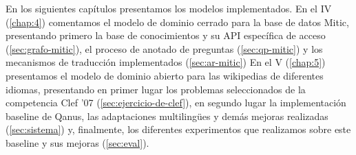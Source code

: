 En los siguientes capítulos presentamos los modelos implementados. En el IV (\ref{chap:4}) comentamos el modelo de dominio cerrado para la base de datos  Mitic, presentando primero la base de conocimientos y su API específica de acceso (\ref{sec:grafo-mitic}), el proceso de anotado de preguntas (\ref{sec:qp-mitic}) y los mecanismos de traducción implementados (\ref{sec:ar-mitic})
En el V (\ref{chap:5}) presentamos el modelo de dominio abierto para las wikipedias de diferentes idiomas, presentando en primer lugar los problemas seleccionados de la competencia Clef '07 (\ref{sec:ejercicio-de-clef}), en segundo lugar la implementación baseline de Qanus, las adaptaciones multilingües y demás mejoras realizadas (\ref{sec:sistema}) y, finalmente, los diferentes experimentos que realizamos sobre este baseline y sus mejoras (\ref{sec:eval}).

\faltadependiente

